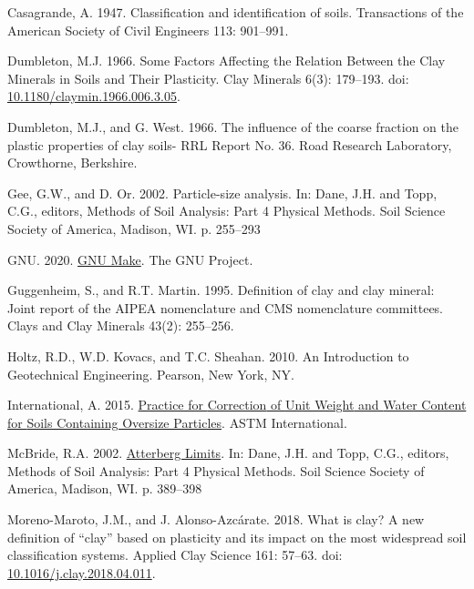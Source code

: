 \documentclass[
  letterpaper,
]{article}
\newlength{\cslhangindent}
\newlength{\cslentryspacingunit} %
\newenvironment{CSLReferences}[2] %
 {%
  \setlength{\parindent}{0pt}
  \ifodd #1
  \let\oldpar\par
  \def\par{\hangindent=\cslhangindent\oldpar}
  \fi
  \setlength{\parskip}{#2\cslentryspacingunit}
 }%
 {}
\begin{document}
\begin{CSLReferences}{1}{0}
\leavevmode{}%
Casagrande, A. 1947. Classification and identification of soils. Transactions of the American Society of Civil Engineers 113: 901--991.

\leavevmode{}%
Dumbleton, M.J. 1966. Some {Factors Affecting} the {Relation Between} the {Clay Minerals} in {Soils} and {Their Plasticity}. Clay Minerals 6(3): 179--193. doi: \href{https://doi.org/10.1180/claymin.1966.006.3.05}{10.1180/claymin.1966.006.3.05}.

\leavevmode{}%
Dumbleton, M.J., and G. West. 1966. The influence of the coarse fraction on the plastic properties of clay soils- {RRL Report No}. 36. {Road Research Laboratory}, {Crowthorne, Berkshire}.

\leavevmode{}%
Gee, G.W., and D. Or. 2002. Particle-size analysis. In: Dane, J.H. and Topp, C.G., editors, Methods of {Soil Analysis}: {Part} 4 {Physical Methods}. {Soil Science Society of America}, {Madison, WI}. p. 255--293

\leavevmode{}%
GNU. 2020. \href{https://www.gnu.org/software/make/}{{GNU Make}}. {The GNU Project}.

\leavevmode{}%
Guggenheim, S., and R.T. Martin. 1995. Definition of clay and clay mineral: Joint report of the {AIPEA} nomenclature and {CMS} nomenclature committees. Clays and Clay Minerals 43(2): 255--256.

\leavevmode{}%
Holtz, R.D., W.D. Kovacs, and T.C. Sheahan. 2010. An {Introduction} to {Geotechnical Engineering}. {Pearson}, {New York, NY}.

\leavevmode{}%
International, A. 2015. \href{https://doi.org/10.1520/D4718_D4718M-15}{Practice for {Correction} of {Unit Weight} and {Water Content} for {Soils Containing Oversize Particles}}. {ASTM International}.

\leavevmode{}%
McBride, R.A. 2002. \href{https://doi.org/10.2136/sssabookser5.4.c17}{Atterberg {Limits}}. In: Dane, J.H. and Topp, C.G., editors, Methods of {Soil Analysis}: {Part} 4 {Physical Methods}. {Soil Science Society of America}, {Madison, WI}. p. 389--398

\leavevmode{}%
Moreno-Maroto, J.M., and J. Alonso-Azcárate. 2018. What is clay? {A} new definition of {``clay''} based on plasticity and its impact on the most widespread soil classification systems. Applied Clay Science 161: 57--63. doi: \href{https://doi.org/10.1016/j.clay.2018.04.011}{10.1016/j.clay.2018.04.011}.


\end{CSLReferences}
\end{document}

